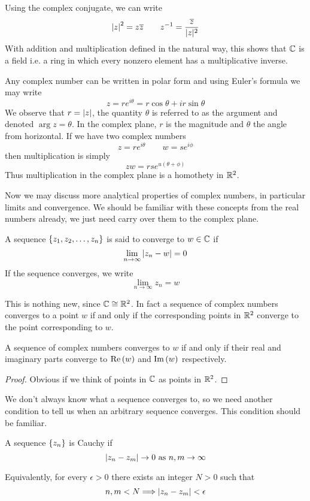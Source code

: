 Using the complex conjugate, we can write
\[ \abs{z}^2 = z \overline{z} \qquad {z}^{-1} = \frac{\overline{z}}{|z|^2} \]
With addition and multiplication defined in the natural way, this shows that $\mathbb{C}$ is a field i.e. a ring in which every nonzero element has a multiplicative inverse. 

Any complex number can be written in polar form and using Euler's formula we may write
\[ z = re^{i\theta} = r \cos\theta + i r\sin\theta \]
We observe that $r = \abs{z}$, the quantity $\theta$ is referred to as the argument and denoted $\arg z = \theta$. In the complex plane, $r$ is the magnitude and $\theta$ the angle from horizontal. If we have two complex numbers
\[ z = re^{i\theta} \qquad w = se^{i\phi} \]
then multiplication is simply
\[ zw = rse^{u(\theta + \phi)} \]
Thus multiplication in the complex plane is a homothety in $\mathbb{R}^2$.

Now we may discuss more analytical properties of complex numbers, in particular limits and convergence. We should be familiar with these concepts from the real numbers already, we just need carry over them to the complex plane. 

\newpage 
\begin{definition}[Convergence]
	A sequence $\left\{z_1, z_2, \ldots, z_n\right\}$ is said to converge to $w \in \mathbb{C}$ if 
	\[\lim_{n \to \infty} \abs{z_n - w} = 0 \]
	If the sequence converges, we write
	\[ \lim_{n \to \infty} z_n = w \]
\end{definition}

This is nothing new, since $\mathbb{C} \cong \mathbb{R}^2$. In fact a sequence of complex numbers converges to a point $w$ if and only if the corresponding points in $\mathbb{R}^2$ converge to the point corresponding to $w$.

\begin{proposition}
	A sequence of complex numbers converges to $w$ if and only if their real and imaginary parts converge to $\Re\left(w\right)$ and $\Im\left(w\right)$ respectively.
\end{proposition}
\begin{proof}
	Obvious if we think of points in $\mathbb{C}$ as points in $\mathbb{R}^2$.
\end{proof}

We don't always know what a sequence converges to, so we need another condition to tell us when an arbitrary sequence converges. This condition should be familiar.

\begin{definition}
	A sequence $\left\{z_n\right\}$ is Cauchy if 
	\[ \abs{z_n - z_m} \to 0 \text{ as } n,m \to \infty \]
	
	Equivalently, for every $\epsilon > 0$ there exists an integer $N > 0$ such that
	\[ n,m < N \Longrightarrow |z_n - z_m| < \epsilon \]
\end{definition}

